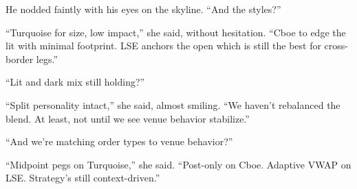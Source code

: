 He nodded faintly with his eyes on the skyline. ``And the styles?''


``Turquoise for size, low impact,'' she said, without hesitation. ``Cboe to edge the lit with minimal footprint. 
LSE anchors the open which is still the best for cross-border legs.''

``Lit and dark mix still holding?''

``Split personality intact,'' she said, almost smiling. ``We haven’t rebalanced the blend. At least, not 
until we see venue behavior stabilize.''

``And we’re matching order types to venue behavior?''

``Midpoint pegs on Turquoise,'' she said. ``Post-only on Cboe. Adaptive VWAP on LSE. Strategy’s still 
context-driven.''

\medskip

